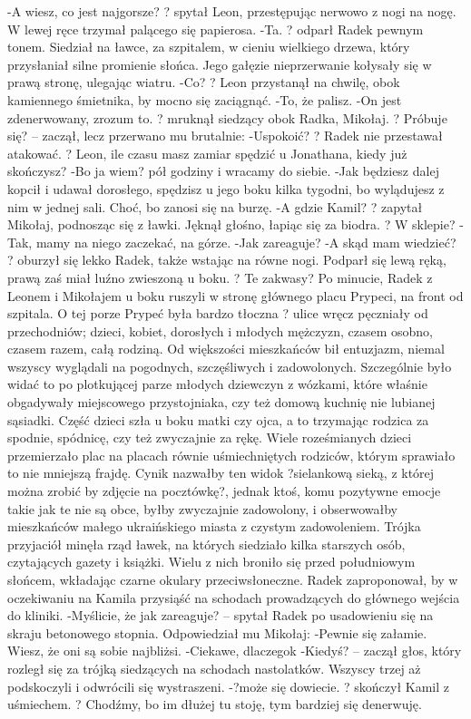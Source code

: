 \documentclass[../MAIN.tex]{subfiles}
\begin{document}
-A wiesz, co jest najgorsze? ? spytał Leon, przestępując nerwowo z nogi na nogę. W lewej ręce trzymał palącego się papierosa.
-Ta. ? odparł Radek pewnym tonem. Siedział na ławce, za szpitalem, w cieniu wielkiego drzewa, który przysłaniał silne promienie słońca. Jego gałęzie nieprzerwanie kołysały się w prawą stronę, ulegając wiatru.
-Co? ? Leon przystanął na chwilę, obok kamiennego śmietnika, by mocno się zaciągnąć.
-To, że palisz.
-On jest zdenerwowany, zrozum to. ? mruknął siedzący obok Radka, Mikołaj. ? Próbuje się? -- zaczął, lecz przerwano mu brutalnie:
-Uspokoić? ? Radek nie przestawał atakować. ? Leon, ile czasu masz zamiar spędzić u Jonathana, kiedy już skończysz?
-Bo ja wiem? pół godziny i wracamy do siebie.
-Jak będziesz dalej kopcił i udawał dorosłego, spędzisz u jego boku kilka tygodni, bo wylądujesz z nim w jednej sali. Choć, bo zanosi się na burzę.
-A gdzie Kamil? ? zapytał Mikołaj, podnosząc się z ławki. Jęknął głośno, łapiąc się za biodra. ? W sklepie?
-Tak, mamy na niego zaczekać, na górze.
-Jak zareaguje?
-A skąd mam wiedzieć? ? oburzył się lekko Radek, także wstając na równe nogi. Podparł się lewą ręką, prawą zaś miał luźno zwieszoną u boku. ? Te zakwasy?
Po minucie, Radek z Leonem i Mikołajem u boku ruszyli w stronę głównego placu Prypeci, na front od szpitala.
O tej porze Prypeć była bardzo tłoczna ? ulice wręcz pęczniały od przechodniów; dzieci, kobiet, dorosłych i młodych mężczyzn, czasem osobno, czasem razem, całą rodziną. Od większości mieszkańców bił entuzjazm, niemal wszyscy wyglądali na pogodnych, szczęśliwych i zadowolonych. Szczególnie było widać to po plotkującej parze młodych dziewczyn z wózkami, które właśnie obgadywały miejscowego przystojniaka, czy też domową kuchnię nie lubianej sąsiadki.
Część dzieci szła u boku matki czy ojca, a to trzymając rodzica za spodnie, spódnicę, czy też zwyczajnie za rękę. Wiele roześmianych dzieci przemierzało plac na placach równie uśmiechniętych rodziców, którym sprawiało to nie mniejszą frajdę.
Cynik nazwałby ten widok ?sielankową sieką, z której można zrobić by zdjęcie na pocztówkę?, jednak ktoś, komu pozytywne emocje takie jak te nie są obce, byłby zwyczajnie zadowolony, i obserwowałby mieszkańców małego ukraińskiego miasta z czystym zadowoleniem.
Trójka przyjaciół minęła rząd ławek, na których siedziało kilka starszych osób, czytających gazety i książki. Wielu z nich broniło się przed południowym słońcem, wkładając czarne okulary przeciwsłoneczne.
Radek zaproponował, by w oczekiwaniu na Kamila przysiąść na schodach prowadzących do głównego wejścia do kliniki.
-Myślicie, że jak zareaguje? -- spytał Radek po usadowieniu się na skraju betonowego stopnia. Odpowiedział mu Mikołaj:
-Pewnie się załamie. Wiesz, że oni są sobie najbliżsi.
-Ciekawe, dlaczego\3k
-Kiedyś? -- zaczął głos, który rozległ się za trójką siedzących na schodach nastolatków. Wszyscy trzej aż podskoczyli i odwrócili się wystraszeni.
-?może się dowiecie. ? skończył Kamil z uśmiechem. ? Chodźmy, bo im dłużej tu stoję, tym bardziej się denerwuję.
\end{document}
